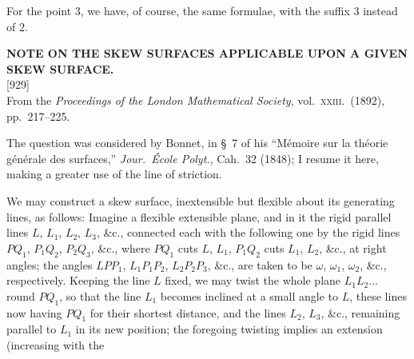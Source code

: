\documentclass[11pt,a4paper]{article}
\newcommand{\paper}[3]{%
  \clearpage
  \begin{center}
    {\large\bfseries #2}\\[0.5em]
    {\small [#1]}\\[0.3em]
    {\small #3}
  \end{center}
  \vspace{0.5em}
}
\begin{document}
For the point 3, we have, of course, the same formulae, with the suffix 3 instead of 2.

\paper{929}{NOTE ON THE SKEW SURFACES APPLICABLE UPON A GIVEN SKEW SURFACE.}{From the \textit{Proceedings of the London Mathematical Society}, vol.\ \textsc{xxiii}.\ (1892), pp.\ 217--225.}

The question was considered by Bonnet, in \S\ 7 of his ``M\'emoire sur la th\'eorie g\'en\'erale des surfaces,'' \textit{Jour.\ \'Ecole Polyt.}, Cah.\ 32 (1848); I resume it here, making a greater use of the line of striction.

We may construct a skew surface, inextensible but flexible about its generating lines, as follows: Imagine a flexible extensible plane, and in it the rigid parallel lines $L$, $L_1$, $L_2$, $L_3$, \&c., connected each with the following one by the rigid lines $PQ_1$, $P_1 Q_2$, $P_2 Q_3$, \&c., where $PQ_1$ cuts $L$, $L_1$, $P_1 Q_2$ cuts $L_1$, $L_2$, \&c., at right angles; the angles $LPP_1$, $L_1 P_1 P_2$, $L_2 P_2 P_3$, \&c., are taken to be $\omega$, $\omega_1$, $\omega_2$, \&c., respectively. Keeping the line $L$ fixed, we may twist the whole plane $L_1 L_2 \ldots$ round $PQ_1$, so that the line $L_1$ becomes inclined at a small angle to $L$, these lines now having $PQ_1$ for their shortest distance, and the lines $L_2$, $L_3$, \&c., remaining parallel to $L_1$ in its new position; the foregoing twisting implies an extension (increasing with the
\end{document}
